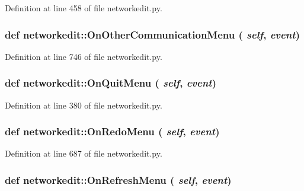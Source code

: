 Definition at line 458 of file networkedit.py.\hypertarget{namespacenetworkedit_9e4005cf6d6c158c997d5efb8b9c2694}{
\subsubsection[OnOtherCommunicationMenu]{\setlength{\rightskip}{0pt plus 5cm}def networkedit::On\-Other\-Communication\-Menu ( {\em self},  {\em event})}}
\label{namespacenetworkedit_9e4005cf6d6c158c997d5efb8b9c2694}




Definition at line 746 of file networkedit.py.\hypertarget{namespacenetworkedit_854bbe7eafaaa933738f2c74569b7ea3}{
\subsubsection[OnQuitMenu]{\setlength{\rightskip}{0pt plus 5cm}def networkedit::On\-Quit\-Menu ( {\em self},  {\em event})}}
\label{namespacenetworkedit_854bbe7eafaaa933738f2c74569b7ea3}




Definition at line 380 of file networkedit.py.\hypertarget{namespacenetworkedit_dd170a72c3140d1508f621922d3c54df}{
\subsubsection[OnRedoMenu]{\setlength{\rightskip}{0pt plus 5cm}def networkedit::On\-Redo\-Menu ( {\em self},  {\em event})}}
\label{namespacenetworkedit_dd170a72c3140d1508f621922d3c54df}




Definition at line 687 of file networkedit.py.\hypertarget{namespacenetworkedit_ef988c30a20345badf3ab9b7fb3577ab}{
\subsubsection[OnRefreshMenu]{\setlength{\rightskip}{0pt plus 5cm}def networkedit::On\-Refresh\-Menu ( {\em self},  {\em event})}}
\label{namespacenetworkedit_ef988c30a20345badf3ab9b7fb3577ab}





